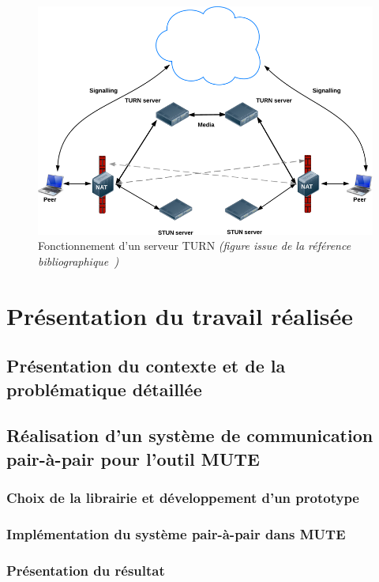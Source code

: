 \documentclass{tnreport}
\begin{document}
\begin{figure}[!h]
  \centering
  \includegraphics[width=14cm]{figures/turn}
  \caption{Fonctionnement d'un serveur TURN \emph{(figure issue de la référence bibliographique~\cite{GettingStartedwithWebRTC})}}
  \label{fig:turn}
\end{figure}

\cleardoublepage

\chapter{Présentation du travail réalisée}

\section{Présentation du contexte et de la problématique détaillée}

\section{Réalisation d'un système de communication pair-à-pair pour l'outil MUTE}

\subsection{Choix de la librairie et développement d'un prototype}

\subsection{Implémentation du système pair-à-pair dans MUTE}

\subsection{Présentation du résultat}
\end{document}
